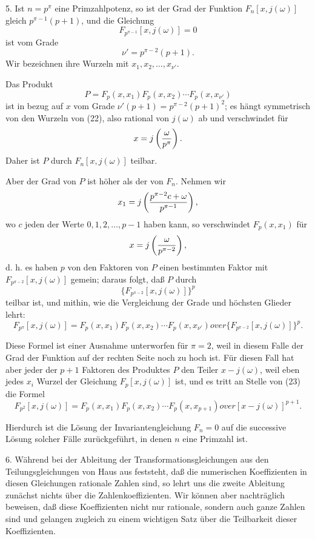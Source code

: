 \documentclass[11pt]{article}
\begin{document}
5. Ist $n=p^\pi$ eine Primzahlpotenz, so ist der Grad der Funktion $F_n[x,j(\omega)]$ gleich
$p^{\pi-1}(p+1)$, und die Gleichung
\begin{equation}
 F_{p^{\pi-1}}[x,j(\omega)]=0
\tag{22}
\end{equation}
ist vom Grade
\[
 \nu'=p^{\pi-2}(p+1).
\]
Wir bezeichnen ihre Wurzeln mit $x_1,x_2,\ldots,x_{\nu'}$.

Das Produkt
\[
 P=F_p(x,x_1)F_p(x,x_2)\cdots F_p(x,x_{\nu'})
\]
ist in bezug auf $x$ vom Grade $\nu'(p+1)=p^{\pi-2}(p+1)^2$; es hängt symmetrisch von
den Wurzeln von (22), also rational von $j(\omega)$ ab und verschwindet für
\[
 x=j\left({\omega\over p^\pi}\right).
\]
Daher ist $P$ durch $F_n[x,j(\omega)]$ teilbar.

Aber der Grad von $P$ ist höher als der von $F_n$. Nehmen wir
\[
 x_1=j\left({p^{\pi-2}c+\omega\over p^{\pi-1}}\right),
\]
wo $c$ jeden der Werte $0,1,2,\ldots,p-1$ haben kann, so verschwindet $F_p(x,x_1)$ für
\[
 x=j\left({\omega\over p^{\pi-2}}\right),
\]
d. h. es haben $p$ von den Faktoren von $P$ einen bestimmten Faktor mit
$F_{p^{\pi-2}}[x,j(\omega)]$ gemein; daraus folgt, daß $P$ durch
\[
 \{F_{p^{\pi-2}}[x,j(\omega)]\}^p
\]
teilbar ist, und mithin, wie die Vergleichung der Grade und höchsten Glieder lehrt:
\begin{equation}
 F_{p^\pi}[x,j(\omega)]={F_p(x,x_1)F_p(x,x_2)\cdots F_p(x,x_{\nu'})
over \{F_{p^{\pi-2}}[x,j(\omega)]\}^p}.
\tag{23}
\end{equation}

Diese Formel ist einer Ausnahme unterworfen für $\pi=2$, weil in diesem Falle der Grad
der Funktion auf der rechten Seite noch zu hoch ist. Für diesen Fall hat aber jeder der
$p+1$ Faktoren des Produktes $P$ den Teiler $x-j(\omega)$, weil eben jedes $x_i$ Wurzel
der Gleichung $F_p[x,j(\omega)]$ ist, und es tritt an Stelle von (23) die Formel
\begin{equation}
 F_{p^2}[x,j(\omega)]={F_p(x,x_1)F_p(x,x_2)\cdots F_p(x,x_{p+1})
over [x-j(\omega)]^{p+1}}.
\tag{24}
\end{equation}

Hierdurch ist die Lösung der Invariantengleichung $F_n=0$ auf die successive Lösung
solcher Fälle zurückgeführt, in denen $n$ eine Primzahl ist.

6. Während bei der Ableitung der Transformationsgleichungen aus den Teilungsgleichungen
von Haus aus feststeht, daß die numerischen Koeffizienten in diesen Gleichungen rationale
Zahlen sind, so lehrt uns die zweite Ableitung zunächst nichts über die Zahlenkoeffizienten.
Wir können aber nachträglich beweisen, daß diese Koeffizienten nicht nur rationale,
sondern auch ganze Zahlen sind und gelangen zugleich zu einem wichtigen Satz über die
Teilbarkeit dieser Koeffizienten.
\end{document}
